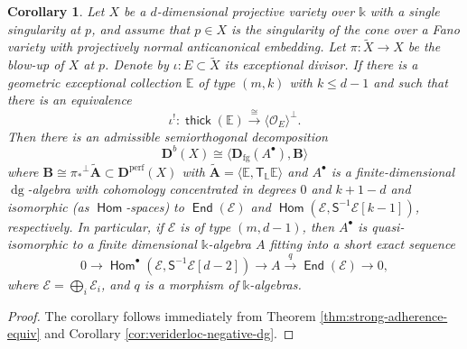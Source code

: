 \documentclass[a4paper,11pt, reqno]{amsart}
\def\E{\mathbb E}
\def\L{\mathbb L}
\def\AA{\mathbf A}
\def\BB{\mathbf B}
\def\DD{\mathbf D}
\def\OO{\mathcal O}
\def\sE{\mathscr{E}}
\def\dg{{\operatorname{dg}}}
\newcommand{\opname}[1]{\operatorname{\mathsf{#1}}}
\newcommand{\Hom}{\opname{Hom}}
\newcommand{\End}{\opname{End}}
\newcommand{\thick}{\opname{thick}\nolimits}
\def\Db{\DD^b}
\def\Dperf{\DD^{\mathrm{perf}}}
\newcommand{\bS}{\mathsf{S}}
\newcommand{\bT}{\mathsf{T}}
\theoremstyle{plain}
\newtheorem{corollary}[dummy]{Corollary}
\theoremstyle{definition}
\numberwithin{equation}{section}
\newlength{\arrow}
\begin{document}
\begin{corollary}\label{eq:cone-absorption}
     Let $X$ be a $d$-dimensional projective variety over $\mathbb k$ with a single   singularity at $p$, and assume that $p\in X$ is the singularity of the cone over a Fano variety 
    with projectively normal anticanonical embedding.
    Let
    $\pi \colon \tilde{X} \to X$ be the blow-up of $X$ at $p$.
    Denote by $\iota \colon E \subset \tilde{X}$ its exceptional divisor.
    If there is a geometric exceptional collection $\E$ of type $(m,k)$ with $k \leq d-1$ and such that there is an equivalence 
     \[
    \iota^! \colon \thick ( \E ) \xrightarrow{\cong} \langle \OO_E \rangle^\perp .
    \]
    Then there is an admissible semiorthogonal decomposition 
    \begin{equation}\label{eq:cone-absorp}
        \Db(X) \cong \langle \DD_{\mathrm{fg}} (A^\bullet ) , \BB \rangle 
    \end{equation}
    where $\BB \cong \pi_\ast {^{\perp}\tilde{\AA}} \subset \Dperf (X)$ with $\tilde{\AA} = \langle \E , \bT_{\L } \E \rangle$ and $A^\bullet $ is a finite-dimensional $\dg$-algebra with cohomology concentrated in degrees $0$ and $k+1-d$ and isomorphic (as $\Hom$-spaces) to $\End ( \sE )$ and $\Hom ( \sE , \bS^{-1} \sE [k-1] )$, respectively.
    In particular, if $\sE$ is of type $(m, d-1 )$, then $A^\bullet$ is quasi-isomorphic to a finite dimensional $\mathbb{k}$-algebra $A$ fitting into a short exact sequence
    \begin{equation}\label{eq:ses-algebra-A}
        0\to \Hom^\bullet ( \sE , \bS^{-1} \sE [d-2] ) \to A \xrightarrow{q} \End (  \sE ) \to 0 ,
    \end{equation}
    where $\sE = \bigoplus_i \sE_i$, and $q$ is a morphism of $\mathbb{k}$-algebras.
\end{corollary}

\begin{proof}
    The corollary follows immediately from Theorem \ref{thm:strong-adherence-equiv} and Corollary \ref{cor:veriderloc-negative-dg}.
\end{proof}


    
\end{document}
